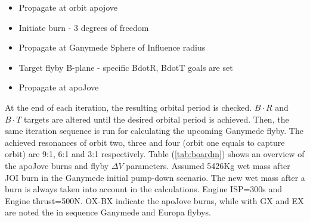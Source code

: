 \begin{itemize}
  \item Propagate at orbit apojove
  \item Initiate burn - 3 degrees of freedom
  \item Propagate at Ganymede Sphere of Influence radius
  \item Target flyby B-plane - specific BdotR, BdotT goals are set
  \item Propagate at apoJove
\end{itemize}

\noindent
At the end of each iteration, the resulting orbital period is checked. $B\cdot R$ and $B\cdot T$ targets are altered until the desired orbital period is achieved. Then, the same iteration sequence is run for calculating the upcoming Ganymede flyby. The achieved resonances of orbit two, three and four (orbit one equals to capture orbit) are 9:1, 6:1 and 3:1 respectively. 
Table (\ref{tab:boardm}) shows an overview of the apoJove burns and flyby $\Delta V$ parameters. Assumed 5426Kg wet mass after JOI burn in the Ganymede initial pump-down scenario. The new wet mass after a burn is always taken into account in the calculations. Engine ISP=300s and Engine thrust=500N. OX-BX indicate the apoJove burns, while with GX and EX are noted the in sequence Ganymede and Europa flybys.

